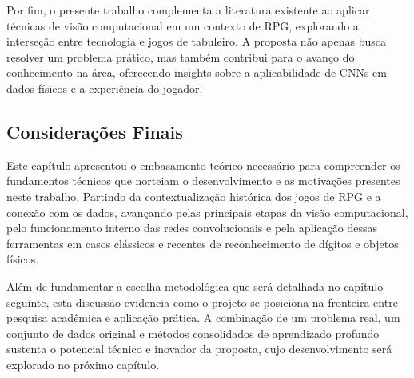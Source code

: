 Por fim, o presente trabalho complementa a literatura existente ao aplicar técnicas de visão computacional em um contexto de RPG,
explorando a interseção entre tecnologia e jogos de tabuleiro. A proposta não apenas busca resolver um problema prático, mas também
contribui para o avanço do conhecimento na área, oferecendo insights sobre a aplicabilidade de CNNs em dados físicos e a experiência do jogador.

\subsection{Considerações Finais}

Este capítulo apresentou o embasamento teórico necessário para compreender os fundamentos técnicos que norteiam o desenvolvimento e as 
motivações presentes neste trabalho. Partindo da contextualização histórica dos jogos de RPG e a conexão com os dados, avançando pelas 
principais etapas da visão computacional, pelo funcionamento interno das redes convolucionais e pela aplicação dessas ferramentas em casos 
clássicos e recentes de reconhecimento de dígitos e objetos físicos.

Além de fundamentar a escolha metodológica que será detalhada no capítulo seguinte, esta discussão evidencia como o projeto se 
posiciona na fronteira entre pesquisa acadêmica e aplicação prática. A combinação de um problema real, um conjunto de dados original e 
métodos consolidados de aprendizado profundo sustenta o potencial técnico e inovador da proposta, cujo desenvolvimento será explorado 
no próximo capítulo.


